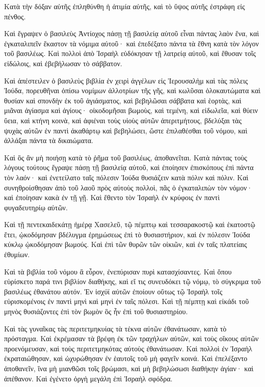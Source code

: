 {Κατὰ τὴν δόξαν αὐτῆς ἐπληθύνθη ἡ ἀτιμία αὐτῆς, καὶ τὸ ὕψος αὐτῆς ἐστράφη εἰς πένθος.
\par }{\PP {}Καὶ ἔγραψεν ὁ βασιλεὺς Ἀντίοχος πάσῃ τῇ βασιλείᾳ αὐτοῦ εἶναι πάντας λαὸν ἕνα,
καὶ ἐγκαταλιπεῖν ἕκαστον τὰ νόμιμα αὐτοῦ· καὶ ἐπεδέξατο πάντα τὰ ἔθνη κατὰ τὸν λόγον τοῦ βασιλέως.
Καὶ πολλοὶ ἀπὸ Ἰσραὴλ εὐδόκησαν τῇ λατρείᾳ αὐτοῦ, καὶ ἔθυσαν τοῖς εἰδώλοις, καὶ ἐβεβήλωσαν τὸ σάββατον.
\par }{\PP {}Καὶ ἀπέστειλεν ὁ βασιλεὺς βιβλία ἐν χειρὶ ἀγγέλων εἰς Ἱερουσαλὴμ καὶ τὰς πόλεις Ἰούδα, πορευθῆναι ὀπίσω νομίμων ἀλλοτρίων τῆς γῆς,
καὶ κωλῦσαι ὁλοκαυτώματα καὶ θυσίαν καὶ σπονδὴν ἐκ τοῦ ἁγιάσματος, καὶ βεβηλῶσαι σάββατα καὶ ἑορτὰς,
καὶ μιᾶναι ἁγίασμα καὶ ἁγίους·
οἰκοδομῆσαι βωμοὺς, καὶ τεμένη, καὶ εἰδωλεῖα, καὶ θύειν ὕεια, καὶ κτήνη κοινὰ,
καὶ ἀφιέναι τοὺς υἱοὺς αὐτῶν ἀπεριτμήτους, βδελύξαι τὰς ψυχὰς αὐτῶν ἐν παντὶ ἀκαθάρτῳ καὶ βεβηλώσει,
ὥστε ἐπιλαθέσθαι τοῦ νόμου, καὶ ἀλλάξαι πάντα τὰ δικαιώματα.
\par }{\PP {}Καὶ ὃς ἂν μὴ ποιήσῃ κατὰ τὸ ῥῆμα τοῦ βασιλέως, ἀποθανεῖται.
Κατὰ πάντας τοὺς λόγους τούτους ἔγραψε πάσῃ τῇ βασιλείᾳ αὐτοῦ, καὶ ἐποίησεν ἐπισκόπους ἐπὶ πάντα τὸν λαόν· καὶ ἐνετείλατο ταῖς πόλεσιν Ἰούδα θυσιάζειν κατὰ πόλιν καὶ πόλιν.
Καὶ συνηθροίσθησαν ἀπὸ τοῦ λαοῦ πρὸς αὐτοὺς πολλοὶ, πᾶς ὁ ἐγκαταλιπὼν τὸν νόμον· καὶ ἐποίησαν κακὰ ἐν τῇ γῇ.
Καὶ ἔθεντο τὸν Ἰσραὴλ ἐν κρύφοις ἐν παντὶ φυγαδευτηρίῳ αὐτῶν.
\par }{\PP {}Καὶ τῇ πεντεκαιδεκάτῃ ἡμέρᾳ Χασελεῦ, τῷ πέμπτῳ καὶ τεσσαρακοστῷ καὶ ἑκατοστῷ ἔτει, ᾠκοδόμησαν βδέλυγμα ἐρημώσεως ἐπὶ τὸ θυσιαστήριον, καὶ ἐν πόλεσιν Ἰούδα κύκλῳ ᾠκοδόμησαν βωμούς.
Καὶ ἐπὶ τῶν θυρῶν τῶν οἰκιῶν, καὶ ἐν ταῖς πλατείαις ἐθυμίων.
\par }{\PP {}Καὶ τὰ βιβλία τοῦ νόμου ἃ εὗρον, ἐνεπύρισαν πυρὶ κατασχίσαντες.
Καὶ ὅπου εὑρίσκετο παρά τινι βιβλίον διαθήκης, καὶ εἴ τις συνευδόκει τῷ νόμῳ, τὸ σύγκριμα τοῦ βασιλέως ἐθανάτου αὐτόν.
Ἐν ἰσχύϊ αὐτῶν ἐποίουν οὕτως τῷ Ἰσραὴλ τοῖς εὑρισκομένοις ἐν παντὶ μηνὶ καὶ μηνὶ ἐν ταῖς πόλεσι.
Καὶ τῇ πέμπτῃ καὶ εἰκάδι τοῦ μηνὸς θυσιάζοντες ἐπὶ τὸν βωμὸν ὃς ἦν ἐπὶ τοῦ θυσιαστηρίου.
\par }{\PP {}Καὶ τὰς γυναῖκας τὰς περιτετμηκυίας τὰ τέκνα αὐτῶν ἐθανάτωσαν, κατὰ τὸ πρόσταγμα.
Καὶ ἐκρέμασαν τὰ βρέφη ἐκ τῶν τραχήλων αὐτῶν, καὶ τοὺς οἴκους αὐτῶν προενόμευσαν, καὶ τοὺς περιτετμηκότας αὐτοὺς ἐθανάτωσαν.
Καὶ πολλοὶ ἐν Ἰσραὴλ ἐκραταιώθησαν, καὶ ὠχυρώθησαν ἐν ἑαυτοῖς τοῦ μὴ φαγεῖν κοινά.
Καὶ ἐπελέξαντο ἀποθανεῖν, ἵνα μὴ μιανθῶσι τοῖς βρώμασι, καὶ μὴ βεβηλώσωσι διαθήκην ἁγίαν· καὶ ἀπέθανον.
Καὶ ἐγένετο ὀργὴ μεγάλη ἐπὶ Ἰσραὴλ σφόδρα.

}
